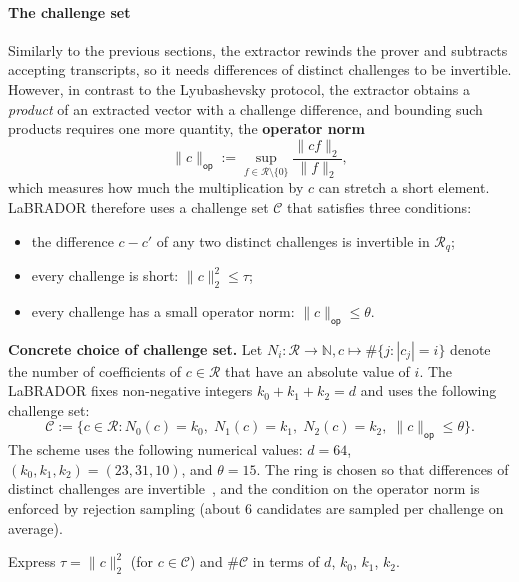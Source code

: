 \documentclass[../../book.tex]{subfiles}
\begin{document}
\paragraph{The challenge set}
Similarly to the previous sections, the extractor rewinds the prover and subtracts accepting transcripts, so it needs differences of distinct challenges to be invertible.
However, in contrast to the Lyubashevsky protocol, the extractor obtains a \emph{product} of an extracted vector with a challenge difference, and bounding such products requires one more quantity, the \textbf{operator norm}
\begin{equation*}
    \|c\|_{\mathsf{op}} := \sup_{f \in \mathcal{R}\setminus\{0\}} \frac{\|cf\|_2}{\|f\|_2},
\end{equation*}
which measures how much the multiplication by $c$ can stretch a short element.
LaBRADOR therefore uses a challenge set $\mathcal{C}$ that satisfies three conditions:
\begin{itemize}
    \item the difference $c - c'$ of any two distinct challenges is invertible in $\mathcal{R}_q$;
    \item every challenge is short: $\|c\|_2^2 \leq \tau$;
    \item every challenge has a small operator norm: $\|c\|_{\mathsf{op}} \leq \theta$.
\end{itemize}

\textbf{Concrete choice of challenge set.}
Let $N_i: \mathcal{R} \to \mathbb{N}, c \mapsto \#\{j: |c_j| = i\}$ denote the number of coefficients of $c \in \mathcal{R}$ that have an absolute value of $i$.
The LaBRADOR fixes non-negative integers $k_0 + k_1 + k_2 = d$ and uses the following challenge set:
\begin{equation*}
    \mathcal{C} := \big\{ c \in \mathcal{R} : N_0(c) = k_0, \; N_1(c) = k_1, \; N_2(c) = k_2, \; \|c\|_{\mathsf{op}} \leq \theta \big\}.
\end{equation*}
The scheme uses the following numerical values: $d = 64$, $(k_0, k_1, k_2) = (23, 31, 10)$, and $\theta = 15$.
The ring is chosen so that differences of distinct challenges are invertible~\cite{EC:LyuSei18}, and the condition on the operator norm is enforced by rejection sampling (about $6$ candidates are sampled per challenge on average).

\begin{exercise}\label{exercise:labrador-challenge-count}
    Express $\tau = \|c\|_2^2$ (for $c \in \mathcal{C}$) and $\#\mathcal{C}$ in terms of $d$, $k_0$, $k_1$, $k_2$.

\end{exercise}
\end{document}
